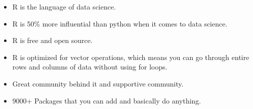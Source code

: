 \begin{itemize}
    \item R is the language of data science.
    \item R is 50\% more influential than python when it comes to data science.
    \item R is free and open source.
    \item R is optimized for vector operations, which means you can go through entire rows and columns of data without using for loops.
    \item Great community behind it and supportive community.
    \item 9000+ Packages that you can add and basically do anything.
\end{itemize}
